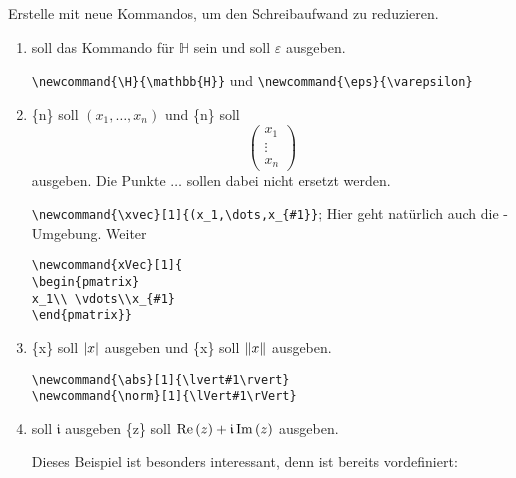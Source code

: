 \item Erstelle mit  neue Kommandos, um den Schreibaufwand zu reduzieren.
    \begin{enumerate}
        \item {} soll das Kommando für $\mathbb{H}$ sein und 
            soll $\varepsilon$ ausgeben.
            \begin{loesung}
                \verb|\newcommand{\H}{\mathbb{H}}| und \verb|\newcommand{\eps}{\varepsilon}|
            \end{loesung}
        \item {}\{n\} soll $(x_1,\dots,x_n)$ und \{n\} soll 
            \[
                \begin{pmatrix}
                x_1 \\ \vdots \\ x_n
                \end{pmatrix}
            \]
            ausgeben. Die Punkte $\dots$ sollen dabei nicht ersetzt werden.
            \begin{loesung}
                \verb|\newcommand{\xvec}[1]{(x_1,\dots,x_{#1}}|; Hier geht
                natürlich auch die -Umgebung. Weiter
            \begin{verbatim}
\newcommand{xVec}[1]{
\begin{pmatrix}
x_1\\ \vdots\\x_{#1}
\end{pmatrix}}
            \end{verbatim}
            \end{loesung}
        \item {}\{x\} soll $\abs{x}$ ausgeben und \{x\}
            soll $\norm{x}$ ausgeben.
            \begin{loesung}
                \begin{verbatim}
\newcommand{\abs}[1]{\lvert#1\rvert}
\newcommand{\norm}[1]{\lVert#1\rVert}
                \end{verbatim}
            \end{loesung}
        \item {} soll $\mathfrak{i}$ ausgeben \{z\} soll
            $\operatorname{Re}\left(z\right)+\mathfrak{i}\operatorname{Im}\left(z\right)$ ausgeben.
            \begin{loesung}
                Dieses Beispiel ist besonders interessant, denn  ist
                bereits vordefiniert: 
                \begin{verbatim}

\end{verbatim}
\end{loesung}
\end{enumerate}
